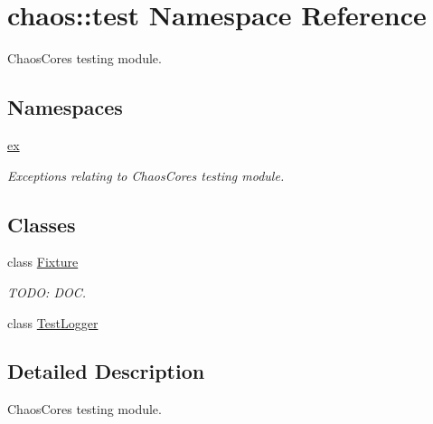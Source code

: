 \hypertarget{namespacechaos_1_1test}{}\section{chaos\+:\+:test Namespace Reference}
\label{namespacechaos_1_1test}


Chaos\+Core\textquotesingle{}s testing module.  


\subsection*{Namespaces}
\begin{DoxyCompactItemize}
\item 
 \hyperlink{namespacechaos_1_1test_1_1ex}{ex}
\begin{DoxyCompactList}\small\item\em Exceptions relating to Chaos\+Core\textquotesingle{}s testing module. \end{DoxyCompactList}\end{DoxyCompactItemize}
\subsection*{Classes}
\begin{DoxyCompactItemize}
\item 
class \hyperlink{classchaos_1_1test_1_1_fixture}{Fixture}
\begin{DoxyCompactList}\small\item\em T\+O\+D\+O\+: D\+O\+C. \end{DoxyCompactList}\item 
class \hyperlink{classchaos_1_1test_1_1_test_logger}{Test\+Logger}
\end{DoxyCompactItemize}


\subsection{Detailed Description}
Chaos\+Core\textquotesingle{}s testing module. 